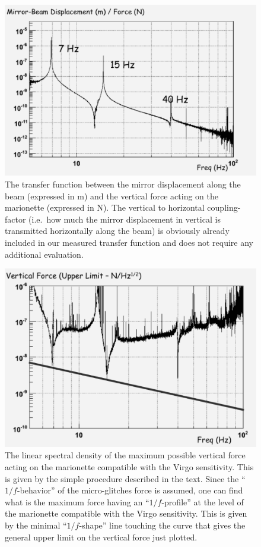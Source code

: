 \begin{figure}[t]
	\begin{center}
		\includegraphics[width=15cm]{./Sec_Suspensions/Figures/Creep-Fig3.pdf}
			\caption{The transfer function between the mirror displacement along the beam (expressed in m) and the vertical force acting on the marionette (expressed in N). The vertical to horizontal coupling-factor (i.e.\ how much the mirror displacement in vertical is transmitted horizontally along the beam) is obviously already included in our measured transfer function and does not require any additional evaluation.}
\label{CFig3}
	\end{center}
\end{figure}
\begin{figure}[t]
	\begin{center}
		\includegraphics[width=15cm]{./Sec_Suspensions/Figures/Creep-Fig4.pdf}
			\caption{The linear spectral density of the maximum possible vertical force acting on the marionette compatible with the Virgo sensitivity. This is given by the simple procedure described in the text. Since the ``$1/f$-behavior'' of the micro-glitches force is assumed, one can find what is the maximum force having an ``$1/f$-profile'' at the level of the marionette compatible with the Virgo sensitivity. This is given by the minimal ``$1/f$-shape'' line touching the curve that gives the general upper limit on the vertical force just plotted. }
\label{CFig4}
	\end{center}
\end{figure}
